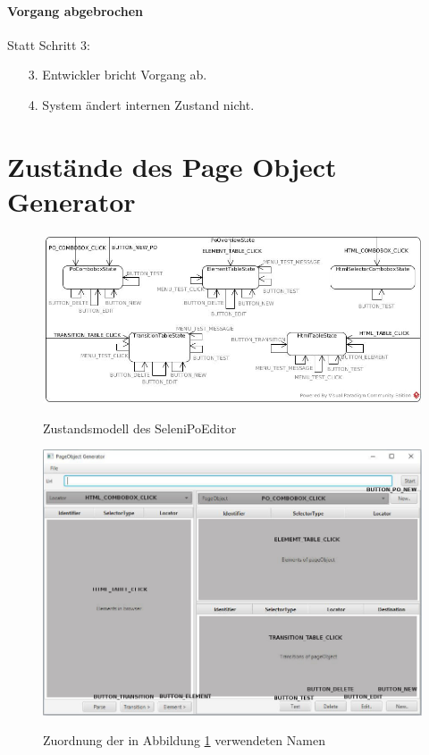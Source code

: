 \paragraph{Vorgang abgebrochen}
Statt Schritt 3:
\begin{itemize}[itemsep=0pt]
\item[3.] Entwickler bricht Vorgang ab. 
\item[4.] System ändert internen Zustand nicht. 
\end{itemize}

\newpage
\section{Zustände des Page Object Generator}
\label{sec:zustände_des_page_object_generator}


\begin{figure}[htb]
  \centering  
  \includegraphics[scale=0.43]{img/StateMashine.jpg}\\
  \caption{Zustandsmodell des SeleniPoEditor}
  \label{fig:state_mashine}
\end{figure}

\begin{figure}[htb]
  \centering  
  \includegraphics[scale=0.4]{img/poGeneratorEvents.jpg}\\
  \caption{Zuordnung der in Abbildung \ref{fig:state_mashine} verwendeten Namen }
  \label{fig:state_mashine_zuordnung}
\end{figure}

